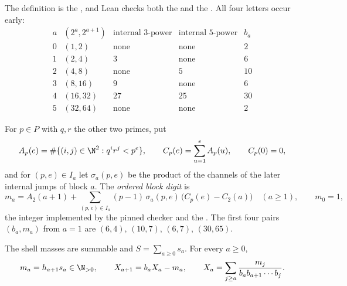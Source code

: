 \noindent The definition is the
, and Lean checks both the
 and the
.  All four letters occur early:
\[
\begin{array}{c|c|c|c|c}
a & (2^{a},2^{a+1}) & \text{internal }3\text{-power} & \text{internal }5\text{-power} & b_a\\ \hline
0 & (1,2)   & \text{none} & \text{none} & 2\\
1 & (2,4)   & 3           & \text{none} & 6\\
2 & (4,8)   & \text{none} & 5           & 10\\
3 & (8,16)  & 9           & \text{none} & 6\\
4 & (16,32) & 27          & 25          & 30\\
5 & (32,64) & \text{none} & \text{none} & 2
\end{array}
\]

For $p\in P$ with $q,r$ the other two primes, put
\[
 A_p(e)=\#\{(i,j)\in\N^2:q^{i}r^{j}<p^{e}\},\qquad
 C_p(e)=\sum_{u=1}^{e}A_p(u),\qquad C_p(0)=0 ,
\]
and for $(p,e)\in I_a$ let $\sigma_a(p,e)$ be the product of the channels of
the later internal jumps of block $a$.  The \emph{ordered block digit} is
\begin{equation}\label{long269:eq:actual-digit}
 m_a=A_2(a+1)+\sum_{(p,e)\in I_a}(p-1)\,\sigma_a(p,e)\,
        \bigl(C_p(e)-C_2(a)\bigr)\quad(a\ge1),
 \qquad m_0=1 ,
\end{equation}
the integer implemented by the pinned checker and the
.  The first four pairs $(b_a,m_a)$ from $a=1$ are
$(6,4)$, $(10,7)$, $(6,7)$, $(30,65)$.

\begin{theorem}\label{long269:res:actual-orbit}
The shell masses are summable and $S=\sum_{a\ge0}s_a$.  For every $a\ge0$,
\begin{equation}\label{long269:eq:shell-digit-identity}
 m_a=h_{a+1}s_a\in\N_{>0},
 \qquad
 X_{a+1}=b_aX_a-m_a,
 \qquad
 X_a=\sum_{j\ge a}\frac{m_j}{b_ab_{a+1}\cdots b_j} .
\end{equation}
\end{theorem}

